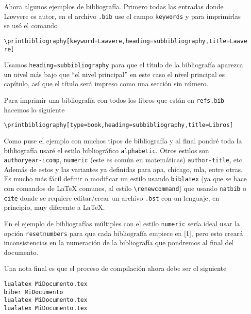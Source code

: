 Ahora algunos ejemplos de bibliografía. Primero todas las entradas donde
Lawvere es autor, en el archivo \texttt{.bib} use el campo \texttt{keywords}
y para imprimirlas se usó el comando
\begin{flushleft}
  \verb|\printbibliography[keyword=Lawvere,heading=subbibliography,title=Lawvere]|
\end{flushleft}
\printbibliography[keyword=Lawvere,heading=subbibliography,title=Lawvere]

Usamos \texttt{heading=subbibliography} para que el título de la bibliografía
aparezca un nivel más bajo que \enquote{el nivel principal} en este caso el nivel
principal es capítulo, así que el título será impreso como una sección sin
número.

Para imprimir una bibliografía con todos los libros que están en
\texttt{refs.bib} hacemos lo siguiente
\begin{flushleft}
  \verb|\printbibliography[type=book,heading=subbibliography,title=Libros]|
\end{flushleft}
\printbibliography[type=book,heading=subbibliography,title=Libros]

Como puse el ejemplo con muchos tipos de bibliografía y al final pondré toda
la bibliografía usaré el estilo bibliográfico \texttt{alphabetic}.
Otros estilos son \texttt{authoryear-icomp}, \texttt{numeric} (este es común
en matemáticas) \texttt{author-title}, etc. Además de estos y las variantes
ya definidas para apa, chicago, mla, entre otras. Es mucho más fácil definir
o modificar un estilo usando \texttt{biblatex} (ya que se hace con comandos
de \LaTeX{} comunes, al estilo \verb|\renewcommand|) que usando
\texttt{natbib} o \texttt{cite} donde se requiere editar/crear un archivo
\texttt{.bst} con un lenguaje, en principio, muy diferente a \LaTeX.

En el ejemplo de bibliografías múltiples con el estilo \texttt{numeric}
sería ideal usar la opción \texttt{resetnumbers} para que cada bibliografía
empiece en [1], pero esto creará inconsistencias en la numeración de la
bibliografía que pondremos al final del documento.

Una nota final es que el proceso de compilación ahora debe ser el siguiente
\begin{flushleft}
\verb|lualatex MiDocumento.tex|\\
\verb|biber MiDocumento|\\
\verb|lualatex MiDocumento.tex|\\
\verb|lualatex MiDocumento.tex|
\end{flushleft}
